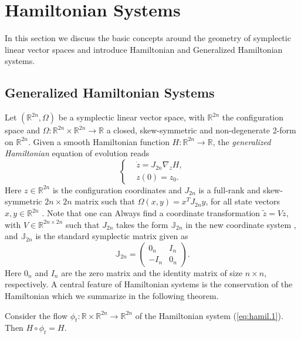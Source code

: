 \section{Hamiltonian Systems}
\label{sec:hamil}

In this section we discuss the basic concepts around the geometry of symplectic linear vector spaces and introduce Hamiltonian and Generalized Hamiltonian systems.

\subsection{Generalized Hamiltonian Systems}
\label{sec:hamil.1}

Let $(\mathbb R^{2n}, \Omega)$ be a symplectic linear vector space, with $\mathbb R^{2n}$ the configuration space and $\Omega:\mathbb R^{2n}\times\mathbb R^{2n} \to \mathbb R$ a closed, skew-symmetric and non-degenerate 2-form on $\mathbb R^{2n}$. Given a smooth Hamiltonian function $H:\mathbb R^{2n} \to \mathbb R$, the \emph{generalized Hamiltonian} equation of evolution reads
\begin{equation} \label{eq:hamil.1}
\left\{
\begin{aligned}
	& \dot z = J_{2n} \nabla_z H,  \\
	&  z(0) = z_0.
\end{aligned}
\right.
\end{equation}
Here $z\in \mathbb R^{2n}$ is the configuration coordinates and $J_{2n}$ is a full-rank and skew-symmetric $2n\times 2n$ matrix such that $\Omega(x,y) = x^TJ_{2n}y$, for all state vectors $x,y\in \mathbb R^{2n}$ \cite{Marsden:2010:IMS:1965128}. Note that one can Always find a coordinate transformation $\tilde z = V z$, with $V \in \mathbb R^{2n\times 2n}$ such that $J_{2n}$ takes the form $\mathbb{J}_{2n}$ in the new coordinate system \cite{de2006symplectic}, and $\mathbb{J}_{2n}$ is the standard symplectic matrix given as
\begin{equation} \label{eq:hamil.2}
	\mathbb{J}_{2n} = 
	\begin{pmatrix}
	0_n & I_n \\
	-I_n & 0_n
	\end{pmatrix}.
\end{equation}
Here $0_n$ and $I_n$ are the zero matrix and the identity matrix of size $n\times n$, respectively. A central feature of Hamiltonian systems is the conservation of the Hamiltonian which we summarize in the following theorem.
\begin{theorem}
Consider the flow $\phi_t:\mathbb R \times \mathbb R^{2n} \to \mathbb R^{2n}$ of the Hamiltonian system (\ref{eq:hamil.1}). Then $H \circ \phi_t = H$.
\end{theorem}

